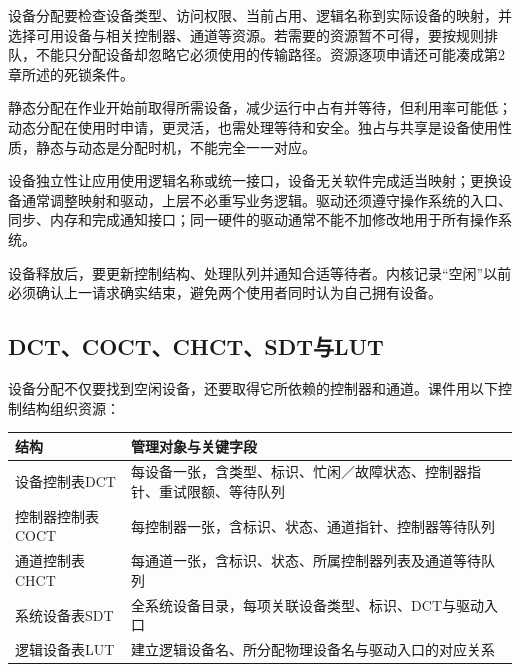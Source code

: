 设备分配要检查设备类型、访问权限、当前占用、逻辑名称到实际设备的映射，并选择可用设备与相关控制器、通道等资源。若需要的资源暂不可得，要按规则排队，不能只分配设备却忽略它必须使用的传输路径。资源逐项申请还可能凑成第2章所述的死锁条件。

静态分配在作业开始前取得所需设备，减少运行中占有并等待，但利用率可能低；动态分配在使用时申请，更灵活，也需处理等待和安全。独占与共享是设备使用性质，静态与动态是分配时机，不能完全一一对应。

设备独立性让应用使用逻辑名称或统一接口，设备无关软件完成适当映射；更换设备通常调整映射和驱动，上层不必重写业务逻辑。驱动还须遵守操作系统的入口、同步、内存和完成通知接口；同一硬件的驱动通常不能不加修改地用于所有操作系统。

设备释放后，要更新控制结构、处理队列并通知合适等待者。内核记录``空闲''以前必须确认上一请求确实结束，避免两个使用者同时认为自己拥有设备。

\subsection{DCT、COCT、CHCT、SDT与LUT}\label{OS05-device-tables}

设备分配不仅要找到空闲设备，还要取得它所依赖的控制器和通道。课件用以下控制结构组织资源：

\par\medskip\noindent\begin{minipage}{\linewidth}\fontsize{9.3}{12}\selectfont\begin{tabularx}{\linewidth}{@{}YY@{}}
\toprule\noalign{}
\begin{minipage}[b]{\linewidth}\raggedright
结构
\end{minipage} & \begin{minipage}[b]{\linewidth}\raggedright
管理对象与关键字段
\end{minipage} \\
\midrule\noalign{}


设备控制表DCT & 每设备一张，含类型、标识、忙闲／故障状态、控制器指针、重试限额、等待队列 \\
控制器控制表COCT & 每控制器一张，含标识、状态、通道指针、控制器等待队列 \\
通道控制表CHCT & 每通道一张，含标识、状态、所属控制器列表及通道等待队列 \\
系统设备表SDT & 全系统设备目录，每项关联设备类型、标识、DCT与驱动入口 \\
逻辑设备表LUT & 建立逻辑设备名、所分配物理设备名与驱动入口的对应关系 \\
\bottomrule\end{tabularx}
\end{minipage}\par\medskip

